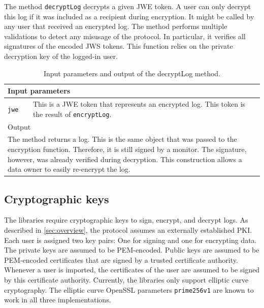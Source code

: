\documentclass[../main.tex]{subfiles}
\begin{document}
The method \verb|decryptLog| decrypts a given JWE token.
A user can only decrypt this log if it was included as a recipient during encryption.
It might be called by any user that received an encrypted log.
The method performs multiple validations to detect any misusage of the protocol.
In particular, it verifies all signatures of the encoded JWS tokens.
This function relies on the private decryption key of the logged-in user.
\begin{table}[ht]
    \centering
    \begin{tabular}{|p{3cm}p{10cm}|}
        \hline
        \multicolumn{2}{|l|}{Input parameters}    \\ \hline
        \verb|jwe|              & This is a JWE token that represents an encrypted log. This token is the result of \verb|encryptLog|. \\ \hline
            \multicolumn{2}{|l|}{Output}   \\ \hline
        \multicolumn{2}{|p{13cm}|}{The method returns a log. This is the same object that was passed to the encryption function. Therefore, it is still signed by a monitor. The signature, however, was already verified during decryption. This construction allows a data owner to easily re-encrypt the log.} \\ \hline
    \end{tabular}
    \caption[Signature of decryptLog]{Input parameters and output of the decryptLog method.}
\end{table}

\subsection{Cryptographic keys}
The libraries require cryptographic keys to sign, encrypt, and decrypt logs.
As described in \cref{sec:overview}, the protocol assumes an externally established PKI.
Each user is assigned two key pairs: 
One for signing and one for encrypting data.
The private keys are assumed to be PEM-encoded.
Public keys are assumed to be PEM-encoded certificates that are signed by a trusted certificate authority.
Whenever a user is imported, the certificates of the user are assumed to be signed by this certificate authority.
Currently, the libraries only support elliptic curve cryptography.
The elliptic curve OpenSSL parameters \verb|prime256v1| are known to work in all three implementations.
\end{document}
